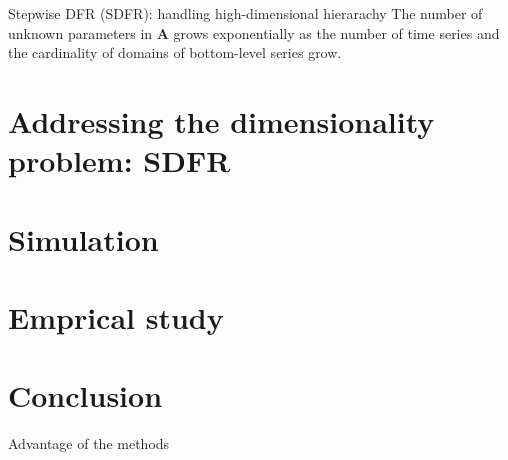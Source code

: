 \documentclass[12pt]{beamer}
\begin{document}
\begin{frame}{Stepwise DFR (SDFR): handling high-dimensional hierarachy}
    The number of unknown parameters in $\mathbf{A}$ grows exponentially as the number of time series and the cardinality of domains of bottom-level series grow.
\end{frame}


\section{Addressing the dimensionality problem: SDFR}

\section{Simulation}

\section{Emprical study}

\section{Conclusion}

\begin{frame}{Advantage of the methods}
    
\end{frame}





\end{document}
